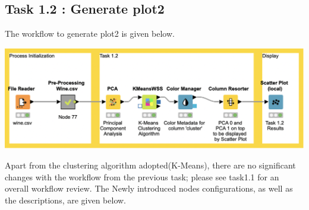 \documentclass[11pt]{article}
\begin{document}
		\subsection*{Task 1.2 : Generate plot2}
			The workflow to generate plot2 is given below.
			\iftrue
			\begin{center}
				\includegraphics[scale=0.35]{res/t1/t12/t12-workflow}
			\end{center}
			\fi
			Apart from the clustering algorithm adopted(K-Means), there are no significant changes with the workflow from the previous task; please see task1.1 for an overall workflow review. The Newly introduced nodes configurations, as well as the descriptions, are given below.
			
\end{document}
